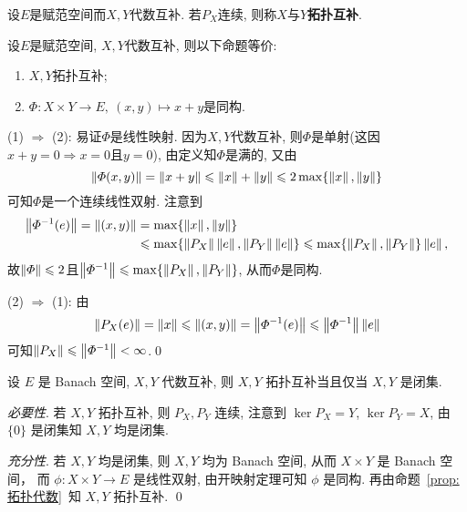 	\begin{Definition}[拓扑互补]
	设$ E $是赋范空间而$ X, Y $代数互补. 若$ P_X $连续, 则称$ X $与$ Y $\textbf{拓扑互补}.
	\end{Definition}
	
	\begin{Proposition}\label{prop:拓扑代数}
	设$ E $是赋范空间, $ X, Y $代数互补, 则以下命题等价:
	\begin{enumerate}[(1)]
	\item $ X, Y $拓扑互补;
	\item $ \varPhi : X\times Y\to E,\ (x,y)\mapsto x+y $是同构.
	\end{enumerate}
	\end{Proposition}
	\begin{Proof}
	(1) $ \Rightarrow $ (2): 易证$ \varPhi $是线性映射. 因为$ X, Y $代数互补, 则$ \varPhi $是单射(这因$ x+y=0\Longrightarrow x=0 $且$ y=0 $), 由定义知$ \varPhi $是满的, 又由
	\[
	\left\| \varPhi(x,y) \right\|=\left\| x+y \right\|\leqslant\left\| x \right\|+\left\| y \right\|\leqslant 2\max\{ \left\| x \right\|,\left\| y \right\| \}
	\]
	可知$ \varPhi $是一个连续线性双射. 注意到
	\[
	\begin{aligned}
	\left\| \varPhi^{-1}(e) \right\|=\left\| (x,y) \right\|&=\max\{ \left\| x \right\|,\left\| y \right\| \}\\
	&\leqslant\max\{ \left\| P_X \right\|\left\| e \right\|, \left\| P_Y \right\|\left\| e \right\| \}\leqslant\max\{ \left\| P_X \right\|,\left\| P_Y \right\| \}\left\| e \right\|,
	\end{aligned}
	\]
	故$ \left\| \varPhi \right\|\leqslant 2 $且$ \left\| \varPhi^{-1} \right\|\leqslant\max\{ \left\| P_X \right\|,\left\| P_Y \right\| \} $, 从而$ \varPhi $是同构.
	
	(2) $ \Rightarrow $ (1): 由
	\[
	\left\| P_X(e) \right\|=\left\| x \right\|\leqslant\left\| (x,y) \right\|=\left\| \varPhi^{-1}(e) \right\|\leqslant\left\| \varPhi^{-1} \right\|\left\| e \right\|
	\]
	可知$ \left\| P_X \right\|\leqslant\left\| \varPhi^{-1} \right\|<\infty $.\qed
	\end{Proof}
	\begin{Corollary}\label{cor:代数互补成为拓扑互补的条件}
		设 $ E $ 是 Banach 空间,  $ X, Y $ 代数互补, 则 $ X, Y $ 拓扑互补当且仅当 $ X, Y $ 是闭集. 
	\end{Corollary}
	\begin{Proof}
		\textsl{必要性}. 若 $ X, Y $ 拓扑互补, 则 $ P_{X}, P_{Y} $ 连续, 注意到 $ \ker P_{X} = Y $,  $ \ker P_{Y}=X $, 由 $ \{0\} $ 是闭集知 $ X, Y $ 均是闭集. 

		\textsl{充分性}.  若 $ X, Y $ 均是闭集, 则 $ X, Y $ 均为 Banach 空间, 从而 $ X\times Y $ 是 Banach 空间， 而 $ \phi : X\times Y\to E $ 是线性双射, 由开映射定理可知 $ \phi $ 是同构. 再由命题~\ref{prop:拓扑代数}~知 $ X, Y $ 拓扑互补. \qed
	\end{Proof}

